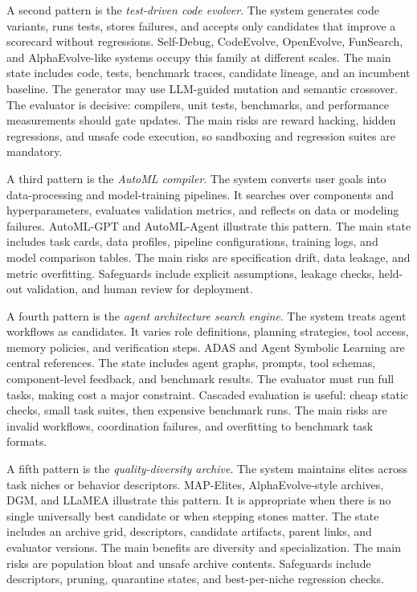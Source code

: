 A second pattern is the \emph{test-driven code evolver}.  The system generates code variants, runs tests, stores failures, and accepts only candidates that improve a scorecard without regressions.  Self-Debug, CodeEvolve, OpenEvolve, FunSearch, and AlphaEvolve-like systems occupy this family at different scales.  The main state includes code, tests, benchmark traces, candidate lineage, and an incumbent baseline.  The generator may use LLM-guided mutation and semantic crossover.  The evaluator is decisive: compilers, unit tests, benchmarks, and performance measurements should gate updates.  The main risks are reward hacking, hidden regressions, and unsafe code execution, so sandboxing and regression suites are mandatory.

A third pattern is the \emph{AutoML compiler}.  The system converts user goals into data-processing and model-training pipelines.  It searches over components and hyperparameters, evaluates validation metrics, and reflects on data or modeling failures.  AutoML-GPT and AutoML-Agent illustrate this pattern.  The main state includes task cards, data profiles, pipeline configurations, training logs, and model comparison tables.  The main risks are specification drift, data leakage, and metric overfitting.  Safeguards include explicit assumptions, leakage checks, held-out validation, and human review for deployment.

A fourth pattern is the \emph{agent architecture search engine}.  The system treats agent workflows as candidates.  It varies role definitions, planning strategies, tool access, memory policies, and verification steps.  ADAS and Agent Symbolic Learning are central references.  The state includes agent graphs, prompts, tool schemas, component-level feedback, and benchmark results.  The evaluator must run full tasks, making cost a major constraint.  Cascaded evaluation is useful: cheap static checks, small task suites, then expensive benchmark runs.  The main risks are invalid workflows, coordination failures, and overfitting to benchmark task formats.

A fifth pattern is the \emph{quality-diversity archive}.  The system maintains elites across task niches or behavior descriptors.  MAP-Elites, AlphaEvolve-style archives, DGM, and LLaMEA illustrate this pattern.  It is appropriate when there is no single universally best candidate or when stepping stones matter.  The state includes an archive grid, descriptors, candidate artifacts, parent links, and evaluator versions.  The main benefits are diversity and specialization.  The main risks are population bloat and unsafe archive contents.  Safeguards include descriptors, pruning, quarantine states, and best-per-niche regression checks.


